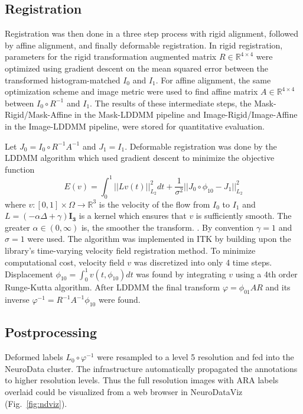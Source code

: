 \documentclass[]{spie}  %
\begin{document}
\subsection{Registration}
Registration was then done in a three step process with rigid alignment, followed by affine alignment, and finally deformable registration.
In rigid registration, parameters for the rigid transformation augmented matrix $R \in \mathbb{R}^{4 \times 4}$ were optimized using gradient descent on the mean squared error between the transformed histogram-matched $I_0$ and $I_1$.
For affine alignment, the same optimization scheme and image metric were used to find affine matrix $A \in \mathbb{R}^{4 \times 4}$ between $I_0 \circ R^{-1}$ and $I_1$.
The results of these intermediate steps, the Mask-Rigid/Mask-Affine in the Mask-LDDMM pipeline and Image-Rigid/Image-Affine in the Image-LDDMM pipeline, were stored for quantitative evaluation.

Let $J_0 = I_0 \circ R^{-1}A^{-1}$ and $J_1 = I_1$. Deformable registration was done by the LDDMM algorithm which used gradient descent to minimize the objective function
\begin{equation*}
 E(v) = \int_0^1 || L v(t) ||^2_{L_2} dt + \frac{1}{\sigma^2} ||J_0 \circ \phi_{10} - J_1||^2_{L_2}
\end{equation*}
where $v : [0,1] \times \Omega \rightarrow \mathbb{R}^3$ is the velocity of the flow from $I_0$ to $I_1$ and $L = (-\alpha \Delta + \gamma) \mathbf{I_3}$ is a kernel which ensures that $v$ is sufficiently smooth.
The greater $\alpha \in (0, \infty)$ is, the smoother the transform. \cite{Beg05}.
By convention $\gamma=1$ and $\sigma=1$ were used.
The algorithm was implemented in ITK by building upon the library's time-varying velocity field registration method.
To minimize computational cost, velocity field $v$ was discretized into only 4 time steps.
Displacement $\phi_{10} = \int_0^1 v(t,\phi_{10}) dt $ was found by integrating $v$ using a 4th order Runge-Kutta algorithm.
After LDDMM the final transform $\varphi = \phi_{01}AR$ and its inverse $\varphi^{-1} = R^{-1}A^{-1}\phi_{10}$  were found.
\subsection{Postprocessing}
Deformed labels $L_0 \circ \varphi^{-1}$ were resampled to a level 5 resolution and fed into the NeuroData cluster.
The infrastructure automatically propagated the annotations to higher resolution levels.
Thus the full resolution images with ARA labels overlaid could be visualized from a web browser in NeuroDataViz (Fig.~\ref{fig:ndviz}).
\end{document}
